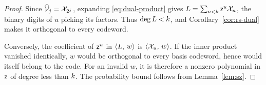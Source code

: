 \begin{proof}
Since $\widehat{\mathcal{V}}_{j}=\mathcal{X}_{2^j}$, expanding \eqref{eq:dual-product} gives $L=\sum_{u<k}\mathsf{z}^u\mathcal{X}_u$, the binary digits of $u$ picking its factors. Thus $\deg L<k$, and Corollary~\ref{cor:rs-dual} makes it orthogonal to every codeword.

Conversely, the coefficient of $\mathsf{z}^u$ in $\langle L,\, w \rangle$ is $\langle \mathcal{X}_u,\, w \rangle$. If the inner product vanished identically, $w$ would be orthogonal to every basis codeword, hence would itself belong to the code. For an invalid $w$, it is therefore a nonzero polynomial in $\mathsf{z}$ of degree less than $k$. The probability bound follows from Lemma~\ref{lem:sz}.
\end{proof}
